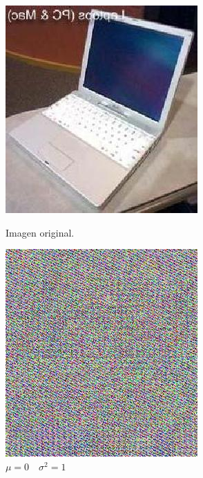 \documentclass[11pt,spanish]{article}
\begin{document}
\begin{figure}[htbp]
	\centering
	\begin{minipage}[b]{0.35\textwidth}
		\includegraphics[width=\textwidth]{../image.jpg}
		\caption{Imagen original.}
		\label{original_img}
	\end{minipage}
	\hfill
	\begin{minipage}[b]{0.35\textwidth}
		\includegraphics[width=\textwidth]{../normalized_image.jpg}
		\caption{$\mu=0 \quad \sigma^2=1$}
		\label{normalized_img}
	\end{minipage}
\end{figure}
\end{document}
